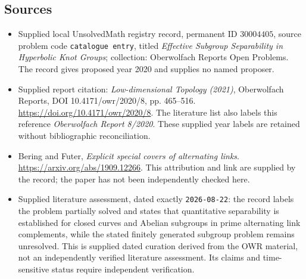 \documentclass[11pt]{article}
\begin{document}
\subsection{Sources}
\begin{itemize}
\item Supplied local UnsolvedMath registry record, permanent ID \(30004405\), source problem code \texttt{catalogue entry}, titled \emph{Effective Subgroup Separability in Hyperbolic Knot Groups}; collection: Oberwolfach Reports Open Problems. The record gives proposed year 2020 and supplies no named proposer.
\item Supplied report citation: \emph{Low-dimensional Topology (2021)}, Oberwolfach Reports, DOI 10.4171/owr/2020/8, pp. 465--516. \url{https://doi.org/10.4171/owr/2020/8}. The literature list also labels this reference \emph{Oberwolfach Report 8/2020}. These supplied year labels are retained without bibliographic reconciliation.
\item Bering and Futer, \emph{Explicit special covers of alternating links}. \url{https://arxiv.org/abs/1909.12266}. This attribution and link are supplied by the record; the paper has not been independently checked here.
\item Supplied literature assessment, dated exactly \texttt{2026-08-22}: the record labels the problem partially solved and states that quantitative separability is established for closed curves and Abelian subgroups in prime alternating link complements, while the stated finitely generated subgroup problem remains unresolved. This is supplied dated curation derived from the OWR material, not an independently verified literature assessment. Its claims and time-sensitive status require independent verification.
\end{itemize}
\end{document}
